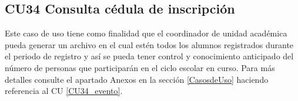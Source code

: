 		\subsection{CU34 Consulta cédula de inscripción}
		\noindent Este caso de uso tiene como finalidad que el coordinador de unidad académica pueda generar un archivo en el cual estén todos los alumnos registrados durante el periodo de registro y así se pueda tener control y conocimiento anticipado del número de personas que participarán en el ciclo escolar en curso. Para más detalles consulte el apartado Anexos en la sección \ref{CasosdeUso} haciendo referencia al CU \ref{CU34_evento}.\\
	
	
